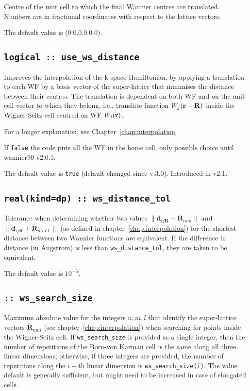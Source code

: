 Centre of the unit cell to which the final Wannier centres are
translated. Numbers are in fractional coordinates with respect to the
lattice vectors.

The default value is (0.0,0.0,0.0).

\subsection[use\_ws\_distance]{\tt logical :: use\_ws\_distance}

Improves the interpolation of the k-space Hamiltonian, by
applying a translation to each WF by a basis
vector of the super-lattice that minimises the distance between their centres.
The translation is dependent on both WF and on the unit cell vector
to which they belong, i.e., translate function $W_j({\bf r}-{\bf R})$ inside
the Wigner-Seitz cell centred on WF $W_i({\bf r})$.

For a longer explanation, see Chapter~\ref{chap:interpolation}.

If {\tt false} the code puts all the WF in the home cell, only possible choice until wannier90 v2.0.1.

The default value is {\tt true} (default changed since v.3.0). Introduced in v2.1.

\subsection[ws\_distance\_tol]{\tt real(kind=dp) :: ws\_distance\_tol}

Tolerance when determining whether two values $\|\mathbf{d}_{ij\mathbf{R}} + \tilde{\mathbf{R}}_{nml} \|$ and $\|\mathbf{d}_{ij\mathbf{R}} + \tilde{\mathbf{R}}_{n'm'l'} \|$ (as defined in chapter~\ref{chap:interpolation}) for the shortest distance between two Wannier functions are equivalent. If the difference in distance (in Angstrom) is less than \texttt{ws\_distance\_tol}, they are taken to be equivalent.

The default value is $10^{-5}$.

\subsection[ws\_search\_size]{\tt :: ws\_search\_size}
Maximum absolute value for the integers $n,m,l$ that identify the super-lattice vectors $\tilde{\mathbf{R}}_{nml}$ (see chapter~\ref{chap:interpolation})
when searching for points inside the Wigner-Seitz cell. 
If \verb#ws_search_size# is provided as a single integer,
then the number of repetitions of the Born-von Karman cell is the same 
along all three linear dimensions; otherwise, if three integers are
provided, the number of repetitions along the $i-$th linear dimension is \verb#ws_search_size(i)#. 
The value default is generally sufficient, but might need to be increased in case of elongated cells.

